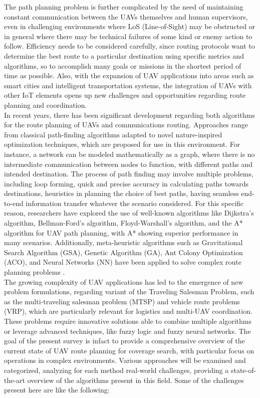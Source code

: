 \documentclass[conference]{IEEEtran}
\begin{document}
The path planning problem is further complicated by the need of maintaining constant communication between the UAVs themselves and human supervisors, even in challenging environments where LoS (Line-of-Sight) may be obstructed or in general where there may be technical failures of some kind or enemy action to follow. Efficiency needs to be considered carefully, since routing protocols want to determine the best route to a particular destination using specific metrics and algorithms, so to accomplish many goals or missions in the shortest period of time as possible. Also, with the expansion of UAV applications into areas such as smart cities and intelligent transportation systems, the integration of UAVs with other IoT elements opens up new challenges and opportunities regarding route planning and coordination. \\

In recent years, there has been significant development regarding both algorithms for the route planning of UAVs and communications routing. Approaches range from classical path-finding algorithms adapted to novel nature-inspired optimization techniques, which are proposed for use in this environment. For instance, a network can be modeled mathematically as a graph, where there is no intermediate communication between nodes to function, with different paths and intended destination. The process of path finding may involve multiple problems, including loop forming, quick and precise accuracy in calculating paths towards destinations, heuristics in planning the choice of best paths, having seamless end-to-end information transfer whatever the scenario considered. For this specific reason, researchers have explored the use of well-known algorithms like Dijkstra's algorithm, Bellman-Ford's algorithm, Floyd-Warshall's algorithm, and the A* algorithm for UAV path planning, with A* showing superior performance in many scenarios. Additionally, meta-heuristic algorithms such as Gravitational Search Algorithm (GSA), Genetic Algorithm (GA), Ant Colony Optimization (ACO), and Neural Networks (NN) have been applied to solve complex route planning problems \cite{paper2}. \\

The growing complexity of UAV applications has led to the emergence of new problem formulations, regarding variant of the Traveling Salesman Problem, such as the multi-traveling salesman problem (MTSP) and vehicle route problems (VRP), which are particularly relevant for logistics and multi-UAV coordination. These problems require innovative solutions able to combine multiple algorithms or leverage advanced techniques, like fuzzy logic and fuzzy neural networks. The goal of the present survey is infact to provide a comprehensive overview of the current state of UAV route planning for coverage search, with particular focus on operations in complex environments. Various approaches will be examined and categorized, analyzing for each method real-world challenges, providing a state-of-the-art overview of the algorithms present in this field. Some of the challenges present here are like the following:
\end{document}

